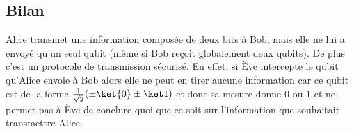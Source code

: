 \documentclass[11pt,class=report,crop=false]{standalone}
\begin{document}
\subsection{Bilan}

Alice transmet une information composée de deux bits à Bob, mais elle ne lui a envoyé qu'un seul qubit (même si Bob reçoit globalement deux qubits).
De plus c'est un protocole de transmission sécurisé. En effet, si Ève intercepte le qubit qu'Alice envoie à Bob alors elle ne peut en tirer aucune information  car ce qubit est de la forme $\frac{1}{\sqrt2}(\pm\ket{0} \pm \ket1)$ et donc sa mesure donne $0$ ou $1$ et ne permet pas à Ève de conclure quoi que ce soit sur l'information que souhaitait transmettre Alice.


\end{document}
